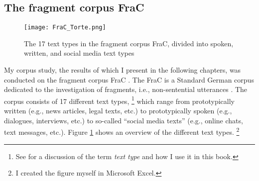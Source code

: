 \subsection{The fragment corpus FraC}\label{sec:corpus.frac}
\begin{figure}
\centering
\texttt{[image: FraC\_Torte.png]}
\caption[The 17 text types  in the fragment corpus FraC, divided into spoken, written, and social media text types]{The 17 text types in the fragment corpus FraC, divided into spoken, written, and social media text types}
\label{fig:frac.overview}
\end{figure}

My corpus study, the results of which I present in the following chapters, was conducted on the fragment corpus FraC \citep{horch.reich2017}.
The FraC is a Standard German corpus dedicated to the investigation of fragments,  i.e., non-sentential utterances \citep[e.g.,][]{morgan1973,merchant2004,reich2007,lemke2021}.
The corpus consists of 17 different text types,%
\footnote{See  for a discussion of the term \textit{text type} and how I use it in this book.}
%
 which range from prototypically written (e.g., news articles, legal texts, etc.) to prototypically spoken (e.g., dialogues, interviews, etc.) to so-called ``social media texts'' (e.g., online chats, text messages, etc.).
Figure \ref{fig:frac.overview} shows an overview of the different text types.%
\footnote{I created the figure myself in Microsoft Excel.}
%

